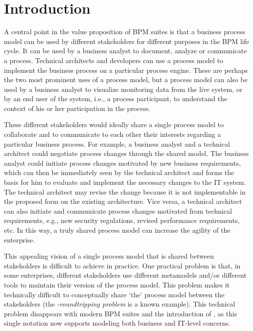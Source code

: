 \section{Introduction}

A central point in the value proposition of BPM suites is that a business process model can be used by different stakeholders for different purposes in the BPM life cycle. It can be used by a business analyst to document, analyze or communicate a process. Technical architects and developers can use a process model to implement the business process on a particular process engine. These are perhaps the two most prominent uses of a process model, but a process model can also be used by a business analyst to visualize monitoring data from the live system, or by an end user of the system, i.e., a process participant, to understand the context of his or her participation in the process.

These different stakeholders would ideally share a single process model to collaborate and to communicate to each other their interests regarding a particular business process. For example, a business analyst and a technical architect could negotiate process changes through the shared model. The business analyst could initiate process changes motivated by new business requirements, which can then be immediately seen by the technical architect and forms the basis for him to evaluate and implement the necessary changes to the IT system. The technical architect may revise the change because it is not implementable in the proposed form on the existing architecture.
Vice versa, a technical architect can also initiate and communicate process changes motivated from technical requirements, e.g., new security regulations, revised performance requirements, etc. In this way, a truly shared process model can increase the agility of the enterprise.

This appealing vision of a single process model that is shared between stakeholders is difficult to achieve in practice. One practical problem is that, in some enterprises, different stakeholders use different metamodels and/or different tools to maintain their version of the process model. This problem makes it technically difficult to conceptually share `the' process model between the stakeholders (the \emph{\bpmn-\bpel roundtripping problem} is a known example). This technical problem disappears with modern BPM suites and the introduction of , as this single notation now supports modeling both business and IT-level concerns.

